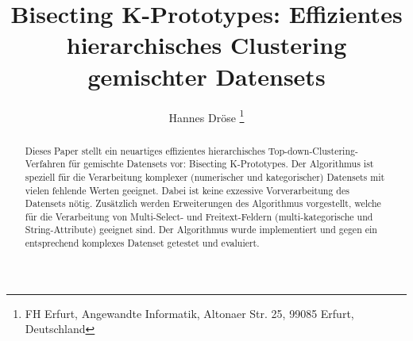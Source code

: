 \documentclass[]{lni}
\begin{document}
\title[Bisecting K-Prototypes]{Bisecting K-Prototypes: Effizientes hierarchisches Clustering gemischter Datensets}
\author[Hannes Dröse]{
    Hannes Dröse
    \footnote{FH Erfurt, Angewandte Informatik, Altonaer Str. 25, 99085 Erfurt, Deutschland
    }
}
\maketitle

\begin{abstract}
    Dieses Paper stellt ein neuartiges effizientes hierarchisches Top-down-Clustering-Verfahren für gemischte Datensets vor: Bisecting K-Prototypes. Der Algorithmus ist speziell für die Verarbeitung komplexer (numerischer und kategorischer) Datensets mit vielen fehlende Werten geeignet. Dabei ist keine exzessive Vorverarbeitung des Datensets nötig. Zusätzlich werden Erweiterungen des Algorithmus vorgestellt, welche für die Verarbeitung von Multi-Select- und Freitext-Feldern (multi-kategorische und String-Attribute) geeignet sind. Der Algorithmus wurde implementiert und gegen ein entsprechend komplexes Datenset getestet und evaluiert.
\end{abstract}




\printbibliography %
\end{document}
